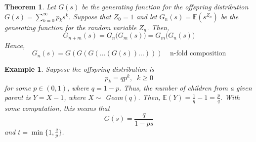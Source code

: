 \documentclass{article}
\newtheorem{theorem}{Theorem}[section]
\newtheorem{example}{Example}[section]
\theoremstyle{remark}
\theoremstyle{definition}
\begin{document}
\begin{theorem}
Let $G(s)$ be the generating function for the offspring distribution $G(s) = \sum_{k=0}^\infty p_k s^k$. Suppose that $Z_0 = 1$ and let $G_n (s) = \mathbb{E}(s^{Z_n})$ be the generating function for the random variable $Z_n$. Then, 
\[G_{n+m} (s) = G_n \big(G_m (s)\big) = G_m \big( G_n (s) \big)\]
Hence, 
\[G_n (s) = G(G(G(...(G(s))...))) \;\;\;\; \text{n-fold composition}\]
\end{theorem}

\begin{example}
Suppose the offspring distribution is
\[p_k = q p^k, \;\; k \geq 0\]
for some $p \in (0, 1)$, where $q = 1-p$. Thus, the number of children from a given parent is $Y = X - 1$, where $X \sim$ Geom$(q)$. Then, $\mathbb{E}(Y) = \frac{1}{q} - 1 = \frac{p}{q}$. With some computation, this means that
\[G(s) = \frac{q}{1- p s}\]
and $t = \min \{1, \frac{q}{p}\}$. 
\end{example}
\end{document}
